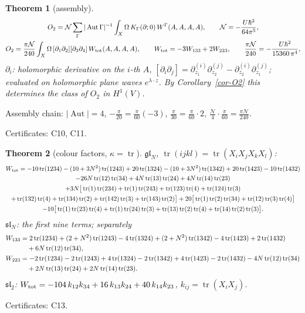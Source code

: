 \documentclass[10pt,a4paper]{article}
\numberwithin{equation}{section}
\newtheorem{theorem}{Theorem}[section]
\theoremstyle{definition}
\theoremstyle{remark}
\newcommand{\tr}{\operatorname{tr}}
\newcommand{\fsl}{\mathfrak{sl}}
\newcommand{\fgl}{\mathfrak{gl}}
\newcommand{\cN}{\mathcal N}
\newcommand{\Aut}{\operatorname{Aut}}
\newcommand{\cert}[1]{\par\noindent\textup{Certificates: #1.}\par}
\begin{document}
\begin{theorem}[assembly]\label{thm-assembly}
\begin{gather}
O_2=\cN\sum_\Gamma|\Aut\Gamma|^{-1}\int_X\Omega\,K_\Gamma(\partial;0)\,W^\Gamma(A,A,A,A),\qquad \cN=-\frac{U\hbar^2}{64\pi^5},\\
O_2=\frac{\pi\cN}{240}\int_X\Omega\,[\partial_1\partial_2][\partial_3\partial_4]\,W_{\rm tot}(A,A,A,A),\qquad W_{\rm tot}=-3W_{133}+2W_{223},\qquad \frac{\pi\cN}{240}=-\frac{U\hbar^2}{15360\,\pi^4},
\end{gather}
$\partial_i$: holomorphic derivative on the $i$-th $A$, $[\partial_i\partial_j]=\partial^{(i)}_{z_1}\partial^{(j)}_{z_2}-\partial^{(i)}_{z_2}\partial^{(j)}_{z_1}$; evaluated on holomorphic plane waves $e^{\lambda\cdot z}$. By Corollary~\ref{cor-O2} this determines the class of $O_2$ in $H^1(V)$.
\end{theorem}
Assembly chain: $|\Aut|=4$, $-\frac\pi{20}=\frac{\pi}{60}(-3)$, $\frac\pi{30}=\frac\pi{60}\cdot2$, $\frac{\cN}4\cdot\frac\pi{60}=\frac{\pi\cN}{240}$.
\cert{C10, C11}

\begin{theorem}[colour factors, $\kappa=\tr$]\label{thm-colour}
$\fgl_N$, $\tr(ijkl)=\tr(X_iX_jX_kX_l)$:
\begin{multline}
W_{\rm tot}=-10\tr(1234)-(10+3N^2)\tr(1243)+20\tr(1324)-(10+3N^2)\tr(1342)+20\tr(1423)-10\tr(1432)\\
-26N\tr(12)\tr(34)+4N\tr(13)\tr(24)+4N\tr(14)\tr(23)\\
+3N\big[\tr(1)\tr(234)+\tr(1)\tr(243)+\tr(123)\tr(4)+\tr(124)\tr(3)\\
+\tr(132)\tr(4)+\tr(134)\tr(2)+\tr(142)\tr(3)+\tr(143)\tr(2)\big]
+20\big[\tr(1)\tr(2)\tr(34)+\tr(12)\tr(3)\tr(4)\big]\\
-10\big[\tr(1)\tr(23)\tr(4)+\tr(1)\tr(24)\tr(3)+\tr(13)\tr(2)\tr(4)+\tr(14)\tr(2)\tr(3)\big].
\end{multline}
$\fsl_N$: the first nine terms; separately
\begin{align}
W_{133}&=2\tr(1234)+(2+N^2)\tr(1243)-4\tr(1324)+(2+N^2)\tr(1342)-4\tr(1423)+2\tr(1432)\notag\\&\quad+6N\tr(12)\tr(34),\\
W_{223}&=-2\tr(1234)-2\tr(1243)+4\tr(1324)-2\tr(1342)+4\tr(1423)-2\tr(1432)-4N\tr(12)\tr(34)\notag\\&\quad+2N\tr(13)\tr(24)+2N\tr(14)\tr(23).
\end{align}
$\fsl_2$: $W_{\rm tot}=-104\,k_{12}k_{34}+16\,k_{13}k_{24}+40\,k_{14}k_{23}$, $k_{ij}=\tr(X_iX_j)$.
\end{theorem}
\cert{C13}
\end{document}
